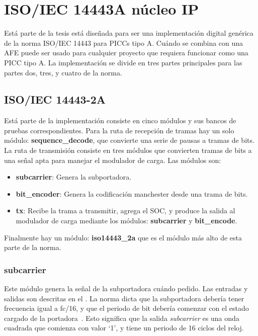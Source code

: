 \documentclass[a4paper, twoside, 11pt]{report}
\begin{document}
\FloatBarrier
\section{ISO/IEC 14443A núcleo IP}

Está parte de la tesis está diseñada para ser una implementación digital genérica de la norma ISO/IEC 14443 para PICCs tipo A. Cuándo se combina con una AFE puede ser usado para cualquier proyecto que requiera funcionar como una PICC tipo A. La implementación  se divide en tres partes principales para las partes dos, tres, y cuatro de la norma.

\FloatBarrier
\subsection{ISO/IEC 14443-2A}

Está parte de la implementación consiste en cinco módulos y sus bancos de pruebas correspondientes. Para la ruta de recepción de tramas hay un solo módulo: \textbf{sequence\_decode}, que convierte una serie de pausas a tramas de bits. La ruta de transmisión consiste en tres módulos que convierten tramas de bits a una señal apta para manejar el modulador de carga. Las módulos son:

\begin{itemize}
  \item \textbf{subcarrier}: Genera la subportadora.
  \item \textbf{bit\_encoder}: Genera la codificación manchester desde una trama de bits.
  \item \textbf{tx}: Recibe la trama a transmitir, agrega el SOC, y produce la salida al modulador de carga mediante los módulos: \textbf{subcarrier} y \textbf{bit\_encode}.
\end{itemize}

Finalmente hay un módulo: \textbf{iso14443\_2a} que es el módulo más alto de esta parte de la norma.

\FloatBarrier
\subsubsection{subcarrier}

Este módulo genera la señal de la subportadora cuándo pedido. Las entradas y salidas son descritas en el . La norma dicta que la subportadora debería tener frecuencia igual a fc/16, y que el periodo de bit debería comenzar con el estado cargado de la portadora~\cite{iso14443-2}. Esto significa que la salida \textit{subcarrier} es una onda cuadrada que comienza con valor ‘1’, y tiene un periodo de 16 ciclos del reloj.
\end{document}
